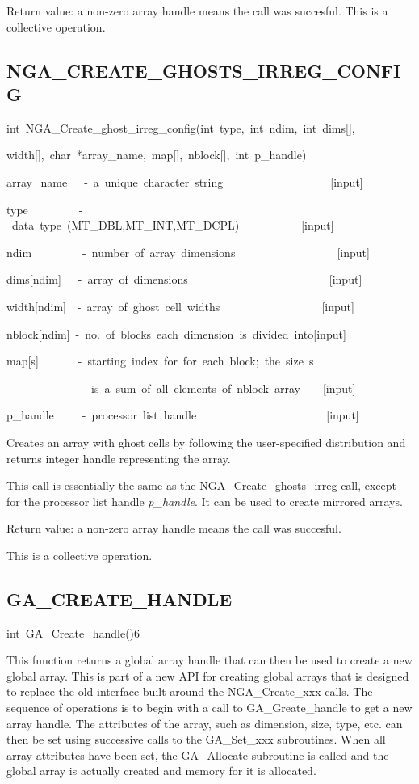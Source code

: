 Return value: a non-zero array handle means the call was succesful.
This is a collective operation.


\subsection*{\label{sub:NGA_CREATE_GHOSTS_IRREG_CONFIG}NGA\_CREATE\_GHOSTS\_IRREG\_CONFIG}
\begin{lyxcode}
int~NGA\_Create\_ghost\_irreg\_config(int~type,~int~ndim,~int~dims{[}{]},

width{[}{]},~char~{*}array\_name,~map{[}{]},~nblock{[}{]},~int~p\_handle)



array\_name~~~-~a~unique~character~string~~~~~~~~~~~~~~~~~~~{[}input{]}~

type~~~~~~~~~-~data~type~(MT\_DBL,MT\_INT,MT\_DCPL)~~~~~~~~~~~{[}input{]}~

ndim~~~~~~~~~-~number~of~array~dimensions~~~~~~~~~~~~~~~~~~{[}input{]}~

dims{[}ndim{]}~~~-~array~of~dimensions~~~~~~~~~~~~~~~~~~~~~~~~~{[}input{]}

width{[}ndim{]}~~-~array~of~ghost~cell~widths~~~~~~~~~~~~~~~~~~{[}input{]}~

nblock{[}ndim{]}~-~no.~of~blocks~each~dimension~is~divided~into{[}input{]}~

map{[}s{]}~~~~~~~-~starting~index~for~for~each~block;~the~size~s~

~~~~~~~~~~~~~~~is~a~sum~of~all~elements~of~nblock~array~~~~{[}input{]}~

p\_handle~~~~~-~processor~list~handle~~~~~~~~~~~~~~~~~~~~~~~{[}input{]}
\end{lyxcode}
Creates an array with ghost cells by following the user-specified
distribution and returns integer handle representing the array.

This call is essentially the same as the NGA\_Create\_ghosts\_irreg
call, except for the processor list handle \emph{p\_handle}. It can
be used to create mirrored arrays.

Return value: a non-zero array handle means the call was succesful.

This is a collective operation. 


\subsection*{\label{sub:GA_CREATE_HANDLE}GA\_CREATE\_HANDLE}
\begin{lyxcode}
int~GA\_Create\_handle()6
\end{lyxcode}
This function returns a global array handle that can then be used
to create a new global array. This is part of a new API for creating
global arrays that is designed to replace the old interface built
around the NGA\_Create\_xxx calls. The sequence of operations is to
begin with a call to GA\_Greate\_handle to get a new array handle.
The attributes of the array, such as dimension, size, type, etc. can
then be set using successive calls to the GA\_Set\_xxx subroutines.
When all array attributes have been set, the GA\_Allocate subroutine
is called and the global array is actually created and memory for
it is allocated.

